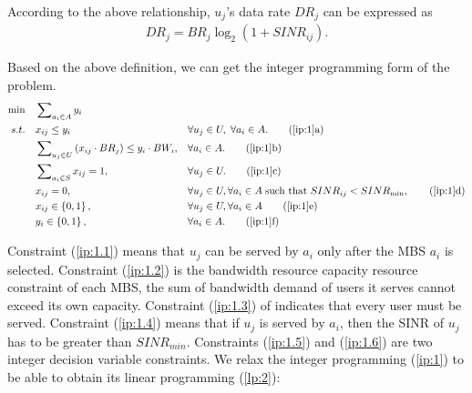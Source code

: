 \documentclass[11pt,a4paper]{article}
\begin{document}
According to the above relationship, $u_j$'s data rate $DR_j$ can be expressed as
\begin{eqnarray}
	D{R_j} = B{R_j}{\log _2}(1 + SIN{R_{ij}}).
\end{eqnarray}


%
Based on the above definition, we can get the integer programming form of the problem.
\begin{align}
	\min \quad  & \sum\nolimits_{{a_i} \in A} {{y_i}} && \label{ip:1}\\
	s.t.\quad &  {x_{ij}} \le {y_i}  &&\forall {u_j} \in U,\;\forall {a_i} \in A. \tag{\ref{ip:1}{a}}\label{ip:1.1}\\
	&  \sum\nolimits_{{u_j} \in U} {({x_{ij}} \cdot B{R_j})}  \le {y_i} \cdot B{W_i},&&\forall {a_i} \in A. \tag{\ref{ip:1}{b}}\label{ip:1.2}\\
	&  \sum\nolimits_{{a_i} \in S} {{x_{ij}}}  = 1,&&\forall {u_j} \in U. \tag{\ref{ip:1}{c}}\label{ip:1.3}\\
	&  {x_{ij}} = 0,&&\forall {u_j} \in U,\forall {a_i} \in A\;{\text{such that }}SIN{R_{ij}} < SIN{R_{\min }}, \tag{\ref{ip:1}{d}}\label{ip:1.4}\\
	&  {x_{ij}} \in \left\{ {0,1} \right\},&&\forall u_j \in U,\forall {a_i} \in A \tag{\ref{ip:1}{e}}\label{ip:1.5}\\
	&  {y_{i}} \in \left\{ {0,1} \right\},&&\forall {a_i} \in A. \tag{\ref{ip:1}{f}}\label{ip:1.6}
\end{align}


Constraint (\ref{ip:1.1}) means that $u_j$ can be served by $a_i$ only after the MBS $a_i$ is selected. Constraint (\ref{ip:1.2}) is the bandwidth resource capacity resource constraint of each MBS, the sum of bandwidth demand of users it serves cannot exceed its own capacity. Constraint (\ref{ip:1.3}) of indicates that every user must be served. Constraint (\ref{ip:1.4}) means that if $u_j$ is served by $a_i$, then the SINR of $u_j$ has to be greater than $SINR_{min}$. Constraints (\ref{ip:1.5}) and (\ref{ip:1.6}) are two integer decision variable constraints. We relax the integer programming (\ref{ip:1}) to be able to obtain its linear programming (\ref{lp:2}):
\end{document}
